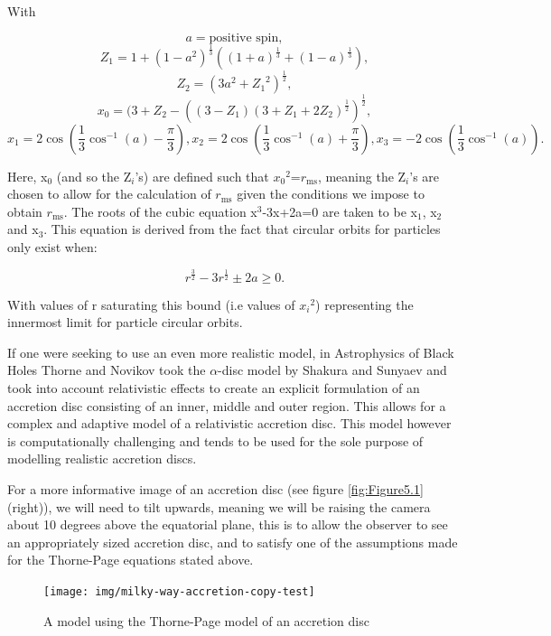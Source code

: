 \documentclass[oneside,openright,frontopenright, singlespacing]{dmathesis}
\begin{document}
\vspace{1em}
	With

	\[a = \mbox{positive spin},\]
	\[Z_1 = 1+(1-a^2)^{\frac{1}{3}}\left((1+a)^{\frac{1}{3}}+(1-a)^{\frac{1}{3}}\right),\]
	\[Z_2 = (3a^2+{Z_1}^2)^{\frac{1}{2}},\]
	\[x_0 = (3+Z_2-\left((3-Z_1)(3+Z_1+2Z_2)^{\frac{1}{2}}\right)^{\frac{1}{2}},\]
	\[x_1 = 2\cos\left(\frac{1}{3}\cos^{-1}(a)-\frac{\pi}{3}\right), x_2 =2\cos\left(\frac{1}{3}\cos^{-1}(a)+\frac{\pi}{3}\right) , x_3 = -2\cos\left(\frac{1}{3}\cos^{-1}(a)\right).\]

\vspace{1em}
	 Here, x$_0$ (and so the Z$_i$'s) are defined such that ${x_0}^2$=$r_{\mbox{ms}}$, meaning the Z$_i$'s are chosen to allow for the calculation of $r_{\mbox{ms}}$ given the conditions we impose to obtain $r_{\mbox{ms}}$. The roots of the cubic equation x$^3$-3x+2a=0 are taken to be x$_1$, x$_2$ and x$_3$. This equation is derived from the fact that circular orbits for particles only exist when:

	\[r^{\frac{3}{2}}-3r^{\frac{1}{2}} \pm 2a \geq 0.\]

\vspace{1em}
	With values of r saturating this bound (i.e values of ${x_i}^2$) representing the innermost limit for particle circular orbits.

\vspace{1em}
	If one were seeking to use an even more realistic model, in Astrophysics of Black Holes\cite{novikov1973astrophyics} Thorne and Novikov took the $\alpha$-disc model by Shakura and Sunyaev\cite{shakura1973black} and took into account relativistic effects to create an explicit formulation of an accretion disc consisting of an inner, middle and outer region. This allows for a complex and adaptive model of a relativistic accretion disc. This model however is computationally challenging and tends to be used for the sole purpose of modelling realistic accretion discs.

\vspace{1em}
	For a more informative image of an accretion disc (see figure \ref{fig:Figure5.1} (right)), we will need to tilt upwards, meaning we will be raising the camera about 10 degrees above the equatorial plane, this is to allow the observer to see an appropriately sized accretion disc, and to satisfy one of the assumptions made for the Thorne-Page equations stated above.

\vspace{1em}
\begin{figure}[!ht]
	\centering
	\texttt{[image: img/milky-way-accretion-copy-test]}
	\caption{A model using the Thorne-Page model of an accretion disc}
	\label{fig:Figure5.3}
\end{figure}
\end{document}
